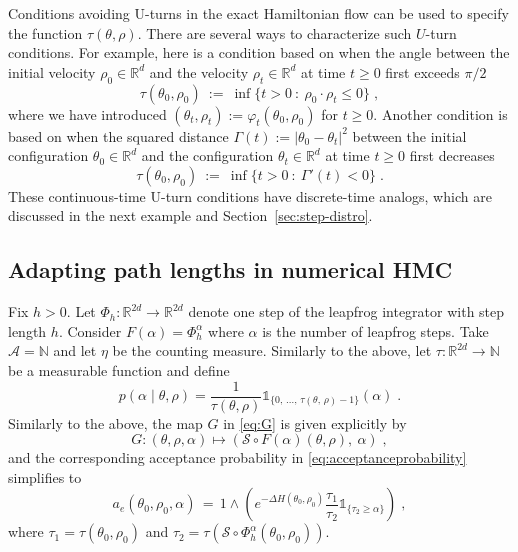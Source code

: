 \documentclass[letterpaper,11pt]{article}
\theoremstyle{plain}%
\theoremstyle{remark}
\begin{document}
Conditions avoiding U-turns in the exact Hamiltonian flow can be used to specify the function $\tau(\theta, \rho)$.  There are several ways to characterize such $U$-turn conditions. For example, here is a condition based on when the angle between the initial velocity $\rho_0 \in \mathbb{R}^d$ and the velocity $\rho_t \in \mathbb{R}^d$ at time $t \ge 0$ first exceeds $\pi/2$ \begin{equation} \label{eq:ct_angle}
\tau(\theta_0, \rho_0) \ := \ \inf\{ t > 0 ~:~ \rho_0 \cdot \rho_t \le 0 \} \;,
\end{equation} where we have introduced $(\theta_t, \rho_t) := \varphi_t(\theta_0, \rho_0)$ for $t \ge 0$.  Another condition is based on when the squared distance $\Gamma(t) := | \theta_0 - \theta_t|^2$ between the initial configuration $\theta_0 \in \mathbb{R}^d$ and the configuration $\theta_t \in \mathbb{R}^d$ at time $t \ge 0$ first decreases \begin{equation} \label{eq:ct_dist}
\tau(\theta_0, \rho_0) \ := \ \inf\{ t > 0 ~:~ \Gamma'(t) < 0 \} \;.
\end{equation}
These continuous-time U-turn conditions have discrete-time analogs, which are discussed in the next example and Section~\ref{sec:step-distro}.  




\subsection{Adapting path lengths in numerical HMC}\label{sec:numericalHMC}

Fix $h>0$.  Let $\Phi_h: \mathbb{R}^{2d} \to \mathbb{R}^{2d}$ denote one step of the leapfrog integrator with step length $h$.  Consider $F(\alpha) = \Phi_h^{\alpha}$ where $\alpha$ is the number of leapfrog steps. Take $\mathcal{A} = \mathbb{N}$ and let $\eta$ be the counting measure. Similarly to the above, let $\tau: \mathbb{R}^{2d} \to \mathbb{N}$ be a measurable function and define \[ p(\alpha \mid \theta, \rho) = \frac{1}{\tau(\theta, \rho)} \mathds{1}_{\{0,\, \dots, \, \tau(\theta, \, \rho)-1\} }(\alpha) \;.  \]
Similarly to the above, the map $G$ in \eqref{eq:G} is given explicitly by \[
G : (\theta, \rho, \alpha) \mapsto ( \mathcal{S} \circ F(\alpha)(\theta, \rho), \ \alpha) \;,
\] and the corresponding acceptance probability in \eqref{eq:acceptanceprobability} simplifies to \[
a_e(\theta_0, \rho_0, \alpha) \, = \, 
1 \wedge \left( e^{-\Delta H(\theta_0, \rho_0)} \frac{\tau_1}{\tau_2} \mathds{1}_{\{ \tau_2 \geq \alpha \} } \right) \;, \]
where $\tau_1 = \tau(\theta_0, \rho_0)$ and $\tau_2 = \tau(\mathcal{S} \circ \Phi^{\alpha}_h(\theta_0, \rho_0))$.
\end{document}
